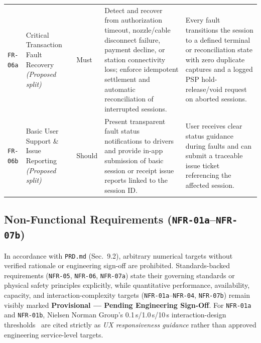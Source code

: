 \begin{table}[htbp]
\begin{tabularx}{\linewidth}{@{}P{15mm} P{28mm} P{14mm} L P{35mm}@{}}
    \texttt{FR-06a} & Critical Transaction Fault Recovery \emph{(Proposed split)} & Must & Detect and recover from authorization timeout, nozzle/cable disconnect failure, payment decline, or station connectivity loss; enforce idempotent settlement and automatic reconciliation of interrupted sessions. & Every fault transitions the session to a defined terminal or reconciliation state with zero duplicate captures and a logged PSP hold-release/void request on aborted sessions. \\
    \texttt{FR-06b} & Basic User Support \& Issue Reporting \emph{(Proposed split)} & Should & Present transparent fault status notifications to drivers and provide in-app submission of basic session or receipt issue reports linked to the session ID. & User receives clear status guidance during faults and can submit a traceable issue ticket referencing the affected session. \\
    \bottomrule
  \end{tabularx}
\end{table}

\subsection{Non-Functional Requirements (\texttt{NFR-01a}--\texttt{NFR-07b})}
\label{sec:nfr}

In accordance with \texttt{PRD.md} (Sec.~9.2), arbitrary numerical targets without verified rationale or engineering sign-off are prohibited. Standards-backed requirements (\texttt{NFR-05}, \texttt{NFR-06}, \texttt{NFR-07a}) state their governing standards or physical safety principles explicitly, while quantitative performance, availability, capacity, and interaction-complexity targets (\texttt{NFR-01a}--\texttt{NFR-04}, \texttt{NFR-07b}) remain visibly marked \textbf{Provisional --- Pending Engineering Sign-Off}. For \texttt{NFR-01a} and \texttt{NFR-01b}, Nielsen Norman Group's 0.1\,s/1.0\,s/10\,s interaction-design thresholds~\cite{nielsen1993responsetimes} are cited strictly as \emph{UX responsiveness guidance} rather than approved engineering service-level targets.

